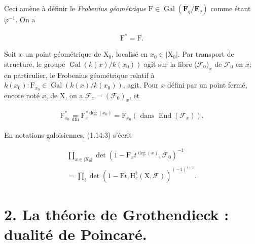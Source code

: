 \documentclass[10pt,leqno]{article}
\begin{document}
\noindent Ceci amène à définir le \emph{Frobenius géométrique} \(\mathrm{F}\in \operatorname{Gal}(\overline{\mathbf{F}}_{q}/\mathbf{F}_{q})\) comme étant \(\varphi ^{- 1}\). On a\par

\begin{equation*}\begin{gathered}\mathrm{F}^{*} = \mathrm{F}.\end{gathered}\tag{1.15.1}\end{equation*}

\noindent Soit \(x\) un point géométrique de \(\mathrm{X}_{0}\), localisé en \(x_{0}\in |\mathrm{X}_{0}|\). Par transport de structure, le groupe \(\operatorname{Gal}(k(x)/k(x_{0}))\) agit sur la fibre (\(\mathcal{F} _{0})_{x}\) de \(\mathcal{F} _{0}\) en \(x\); en particulier, le Frobenius géométrique relatif à \(k(x_{0}) : \mathrm{F}_{x_{0}}\in \operatorname{Gal}(k(x)/k(x_{0}))\), agit. Pour \(x\) défini par un point fermé, encore noté \(x\), de \(\mathrm{X}\), on a \(\mathcal{F} _{x}=(\mathcal{F} _{0})_{x}\), et\par

\begin{equation*}\begin{gathered}\mathrm{F}_{x_{0}}^{*} \underset{\mathrm{dfn}}{=} \mathrm{F}_{x}^{*\operatorname{deg}(x_{0})} = \mathrm{F}_{x_{0}}    (\text{ dans }\operatorname{End}(\mathcal{F} _{x})).\end{gathered}\tag{1.15.2}\end{equation*}

\noindent En notations galoisiennes, (1.14.3) s’écrit\par

\begin{equation*}\begin{gathered}\prod _{x\in |\mathrm{X}_{0}|} \operatorname{det}(1- \mathrm{F}_{x} t^{\operatorname{deg}(x)},\mathcal{F} _{0})^{- 1} \\ = \prod _{i} \operatorname{det}(1- \mathrm{F}t,\mathrm{H}_{c}^{i}(\mathrm{X},\mathcal{F} ))^{(- 1)^{i+1}}.\end{gathered}\end{equation*}

\clearpage

\label{physical-9}\par\smallskip

\section*{2. La théorie de Grothendieck : dualité de Poincaré.}
\end{document}
